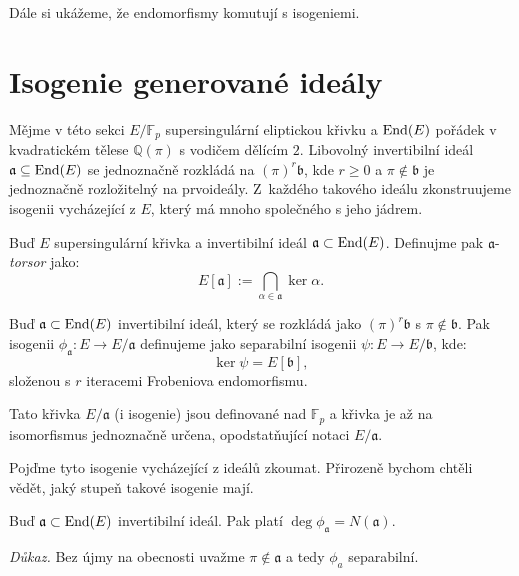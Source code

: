 \documentclass[12pt]{report}
\begin{document}
Dále si ukážeme, že endomorfismy komutují s isogeniemi.


\section{Isogenie generované ideály}

Mějme v této sekci $E/\mathbb{F}_p$ supersingulární eliptickou křivku a $\operatorname{End}(E)$ pořádek v kvadratickém tělese $\mathbb{Q}(\pi)$ s vodičem dělícím $2$. Libovolný invertibilní ideál $\mathfrak{a} \subseteq \operatorname{End}(E)$ se jednoznačně rozkládá na $(\pi)^r \mathfrak{b}$, kde $r \geqslant 0$ a $\pi \not\in \mathfrak{b}$ je jednoznačně rozložitelný na prvoideály. Z~každého takového ideálu zkonstruujeme isogenii vycházející z $E$, který má mnoho společného s jeho jádrem.


\begin{definice}
Buď $E$ supersingulární křivka a invertibilní ideál $\mathfrak{a} \subset \operatorname{End}(E)$.  Definujme pak $\mathfrak{a}$-\textit{torsor} jako:
\begin{equation*}
E[\mathfrak{a}] := \bigcap_{\alpha \in \mathfrak{a}} \ker \alpha.
\end{equation*}
\end{definice}

\begin{definice}
Buď $\mathfrak{a} \subset \operatorname{End}(E)$ invertibilní ideál, který se rozkládá jako $(\pi)^r \mathfrak{b}$ s $\pi \not\in \mathfrak{b}$. Pak isogenii $\phi_{\mathfrak{a}} : E \longrightarrow E/\mathfrak{a}$ definujeme jako separabilní isogenii $\psi : E \longrightarrow E/\mathfrak{b}$, kde:
\begin{equation*}
\ker \psi = E[\mathfrak{b}],
\end{equation*}
složenou s $r$ iteracemi Frobeniova endomorfismu.
\end{definice}

Tato křivka $E/\mathfrak{a}$ (i isogenie) jsou definované nad $\mathbb{F}_p$ a křivka je až na isomorfismus jednoznačně určena, opodstatňující notaci $E/\mathfrak{a}$.

Pojďme tyto isogenie vycházející z ideálů zkoumat. Přirozeně bychom chtěli vědět, jaký stupeň takové isogenie mají.

\begin{lemma}\label{normm}
Buď $\mathfrak{a} \subset \operatorname{End}(E)$ invertibilní ideál. Pak platí $\deg \phi_\mathfrak{a} = N(\mathfrak{a})$. 
\end{lemma}
\noindent \textit{Důkaz.} Bez újmy na obecnosti uvažme $\pi \not\in \mathfrak{a}$ a tedy $\phi_{a}$ separabilní.
\end{document}
